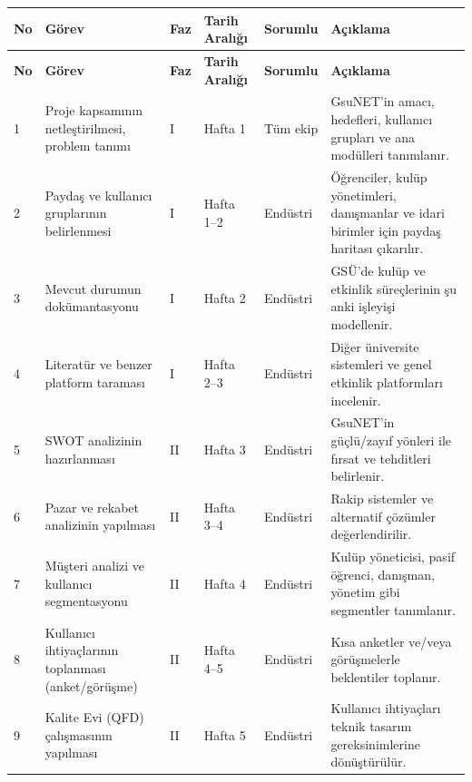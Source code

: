 \documentclass[a4paper,12pt]{report}
\begin{document}
\begin{longtable}{|p{0.5cm}|p{5cm}|p{1cm}|p{2.5cm}|p{2cm}|p{3cm}|}
\hline
\textbf{No} & \textbf{Görev} & \textbf{Faz} & \textbf{Tarih Aralığı} & \textbf{Sorumlu} & \textbf{Açıklama} \\
\hline
\endfirsthead
\hline
\textbf{No} & \textbf{Görev} & \textbf{Faz} & \textbf{Tarih Aralığı} & \textbf{Sorumlu} & \textbf{Açıklama} \\
\hline
\endhead
\hline
\endfoot

1 & Proje kapsamının netleştirilmesi, problem tanımı & I & Hafta 1 & Tüm ekip & GsuNET'in amacı, hedefleri, kullanıcı grupları ve ana modülleri tanımlanır. \\
\hline

2 & Paydaş ve kullanıcı gruplarının belirlenmesi & I & Hafta 1–2 & Endüstri & Öğrenciler, kulüp yönetimleri, danışmanlar ve idari birimler için paydaş haritası çıkarılır. \\
\hline

3 & Mevcut durumun dokümantasyonu & I & Hafta 2 & Endüstri & GSÜ'de kulüp ve etkinlik süreçlerinin şu anki işleyişi modellenir. \\
\hline

4 & Literatür ve benzer platform taraması & I & Hafta 2–3 & Endüstri & Diğer üniversite sistemleri ve genel etkinlik platformları incelenir. \\
\hline

5 & SWOT analizinin hazırlanması & II & Hafta 3 & Endüstri & GsuNET'in güçlü/zayıf yönleri ile fırsat ve tehditleri belirlenir. \\
\hline

6 & Pazar ve rekabet analizinin yapılması & II & Hafta 3–4 & Endüstri & Rakip sistemler ve alternatif çözümler değerlendirilir. \\
\hline

7 & Müşteri analizi ve kullanıcı segmentasyonu & II & Hafta 4 & Endüstri & Kulüp yöneticisi, pasif öğrenci, danışman, yönetim gibi segmentler tanımlanır. \\
\hline

8 & Kullanıcı ihtiyaçlarının toplanması (anket/görüşme) & II & Hafta 4–5 & Endüstri & Kısa anketler ve/veya görüşmelerle beklentiler toplanır. \\
\hline

9 & Kalite Evi (QFD) çalışmasının yapılması & II & Hafta 5 & Endüstri & Kullanıcı ihtiyaçları teknik tasarım gereksinimlerine dönüştürülür. \\
\hline


\end{longtable}
\end{document}
